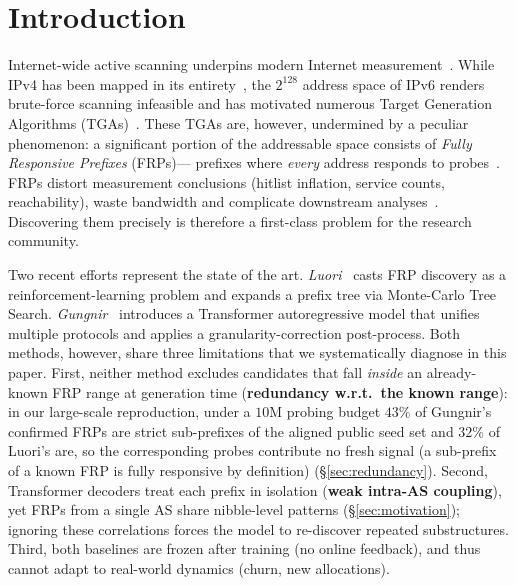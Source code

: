 \documentclass[conference]{IEEEtran}
\begin{document}
\section{Introduction}\label{sec:intro}

Internet-wide active scanning underpins modern Internet
measurement~\cite{durumeric2013zmap,rye2023ipv6hitlist,foremski2016entropy,pour2020comprehensive,durumeric2013zmap-ext,google-v6-stats}.
While IPv4 has been mapped in its
entirety~\cite{durumeric2013zmap,zgrab2}, the $2^{128}$ address space of IPv6
renders brute-force scanning infeasible and has motivated numerous Target Generation Algorithms
(TGAs)~\cite{song2022det,yang20226forest,hou20216hit,zhang20246vision,zhou20236tree-ml,song2020hitlist,liu20166tree,song20206gcvae,song20216veclm,song20216gan,yang20226graph,liu2018build-hitlist}.
These TGAs are, however, undermined by a peculiar phenomenon: a
significant portion of the addressable space consists of
\emph{Fully Responsive Prefixes} (FRPs)--- prefixes where
\emph{every} address responds to
probes~\cite{gasser2018clusters,zirngibl2022rusty,sattler2023hrp,cheng2024luori,cheng2024seed-selection,plonka2015temporal}.
FRPs distort measurement conclusions (hitlist inflation, service
counts, reachability), waste bandwidth and complicate downstream
analyses~\cite{erdemir2025aliases,gharaibeh2017look,li2022fast6,vermeulen2020multilevel,vermeulen2020diamond,eddy2007synflood}.  Discovering them precisely is
therefore a first-class problem for the research community.

Two recent efforts represent the state of the art.
\emph{Luori}~\cite{cheng2024luori} casts FRP discovery as a
reinforcement-learning problem and expands a prefix tree via
Monte-Carlo Tree Search.  \emph{Gungnir}~\cite{wei2025gungnir}
introduces a Transformer autoregressive model that unifies multiple
protocols and applies a granularity-correction post-process.  Both
methods, however, share three limitations that we systematically
diagnose in this paper.
First, neither method excludes candidates that fall \emph{inside} an
already-known FRP range at generation time (\textbf{redundancy
w.r.t.\ the known range}): in our large-scale reproduction, under a
$10$M probing budget $43\%$ of Gungnir's confirmed FRPs are strict
sub-prefixes of the aligned public seed set and $32\%$ of Luori's
are, so the corresponding probes contribute no fresh signal (a sub-prefix of a known FRP is fully responsive by definition) (\S\ref{sec:redundancy}).
Second, Transformer decoders treat each prefix in isolation (\textbf{weak intra-AS coupling}), yet FRPs from a single AS share nibble-level patterns (\S\ref{sec:motivation}); ignoring these correlations forces the model to re-discover repeated substructures.
Third, both baselines are frozen after training (no online feedback), and thus cannot adapt to real-world dynamics (churn, new allocations).
\end{document}

